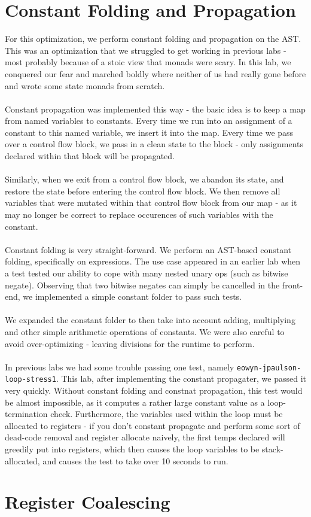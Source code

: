 \documentclass[11pt]{article}
\begin{document}
\section{Constant Folding and Propagation}
For this optimization, we perform constant folding and propagation on the AST. This 
was an optimization that we struggled to get working in previous labs - most probably because
of a stoic view that monads were scary. In this lab, we conquered our fear and marched boldly 
where neither of us had really gone before and wrote some state monads from scratch. \\
\\
Constant propagation was implemented this way - the basic idea is to keep a map from named
variables to constants. Every time we run into an assignment of a constant to this named 
variable, we insert it into the map. Every time we pass over a control flow block, we pass
in a clean state to the block - only assignments declared within that block will be propagated. \\
\\
Similarly, when we exit from a control flow block, we abandon its state, and restore the state 
before entering the control flow block. We then remove all variables that were mutated within that 
control flow block from our map - as it may no longer be correct to replace occurences of such 
variables with the constant. \\
\\
Constant folding is very straight-forward. We perform an AST-based constant folding, specifically
on expressions. The use case appeared in an earlier lab when a test tested our ability to cope with
many nested unary ops (such as bitwise negate). Observing that two bitwise negates can simply be
cancelled in the front-end, we implemented a simple constant folder to pass such tests. \\
\\
We expanded the constant folder to then take into account adding, multiplying and other simple 
arithmetic operations of constants. We were also careful to avoid over-optimizing - leaving 
divisions for the runtime to perform.\\
\\
In previous labs we had some trouble passing one test, namely \verb+eowyn-jpaulson-loop-stress1+. 
This lab, after implementing the constant propagater, we passed it very quickly. Without
constant folding and constnat propagation, this test would be almost impossible, as it computes
a rather large constant value as a loop-termination check. Furthermore, the variables used
within the loop must be allocated to registers - if you don't constant propagate and perform
some sort of dead-code removal and register allocate naively, the first temps declared will 
greedily put into registers, which then causes the loop variables to be stack-allocated,
and causes the test to take over 10 seconds to run. 

\section{Register Coalescing}
\end{document}
